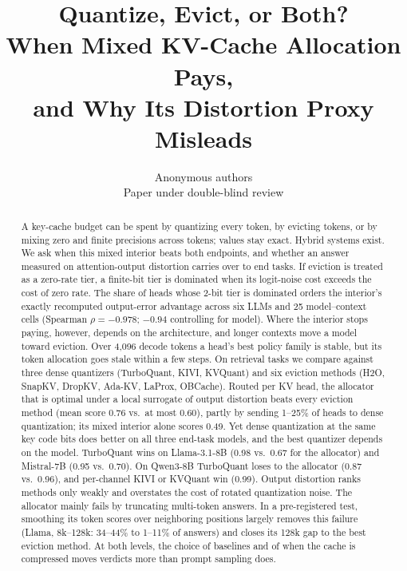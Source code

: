 \documentclass{article}
\title{Quantize, Evict, or Both?\\
When Mixed KV-Cache Allocation Pays,\\
and Why Its Distortion Proxy Misleads}
\author{Anonymous authors \\ Paper under double-blind review}
\theoremstyle{definition}
\begin{document}
\maketitle

\begin{abstract}
A key-cache budget can be spent by quantizing every token, by evicting tokens, or by mixing zero and finite precisions across tokens; values stay exact.  Hybrid systems exist.  We ask when this mixed interior beats both endpoints, and whether an answer measured on attention-output distortion carries over to end tasks.  If eviction is treated as a zero-rate tier, a finite-bit tier is dominated when its logit-noise cost exceeds the cost of zero rate.  The share of heads whose 2-bit tier is dominated orders the interior's exactly recomputed output-error advantage across six LLMs and 25 model--context cells (Spearman $\rho=-0.978$; $-0.94$ controlling for model).  Where the interior stops paying, however, depends on the architecture, and longer contexts move a model toward eviction.  Over 4,096 decode tokens a head's best policy family is stable, but its token allocation goes stale within a few steps.  On retrieval tasks we compare against three dense quantizers (TurboQuant, KIVI, KVQuant) and six eviction methods (H2O, SnapKV, DropKV, Ada-KV, LaProx, OBCache).  Routed per KV head, the allocator that is optimal under a local surrogate of output distortion beats every eviction method (mean score 0.76 vs.\ at most 0.60), partly by sending 1--25\% of heads to dense quantization; its mixed interior alone scores 0.49.
Yet dense quantization at the same key code bits does better on all three end-task models, and the best quantizer depends on the model.  TurboQuant wins on Llama-3.1-8B (0.98 vs.\ 0.67 for the allocator) and Mistral-7B (0.95 vs.\ 0.70).  On Qwen3-8B TurboQuant loses to the allocator (0.87 vs.\ 0.96), and per-channel KIVI or KVQuant win (0.99).  Output distortion ranks methods only weakly and overstates the cost of rotated quantization noise.  The allocator mainly fails by truncating multi-token answers.  In a pre-registered test, smoothing its token scores over neighboring positions largely removes this failure (Llama, 8k--128k: 34--44\% to 1--11\% of answers) and closes its 128k gap to the best eviction method.  At both levels, the choice of baselines and of when the cache is compressed moves verdicts more than prompt sampling does.
\end{abstract}

\end{document}
